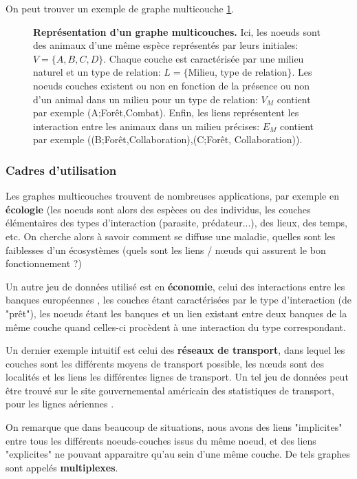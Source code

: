 \documentclass[11pt,a4paper]{article}
\theoremstyle{definition}
\theoremstyle{remark}
\theoremstyle{remark}
\begin{document}
 On peut trouver un exemple de graphe multicouche \cref{exmulti}.

\begin{figure}[h]
	\centering
	
	\caption{\textbf{Représentation d'un graphe multicouches.} Ici, les noeuds sont des animaux d'une même espèce représentés par leurs initiales: $V = \{A ,B,C,D \}$. Chaque couche est caractérisée par une milieu naturel et un type de relation: $L = \{$Milieu, type de relation$\}$. Les noeuds couches existent ou non en fonction de la présence ou non d'un animal dans un milieu pour un type de relation: $V_M$ contient par exemple (A;Forêt,Combat). Enfin, les liens représentent les interaction entre les animaux dans un milieu précises: $E_M$ contient par exemple ((B;Forêt,Collaboration),(C;Forêt, Collaboration)).}
	\label{exmulti}
\end{figure}

\subsubsection{Cadres d'utilisation}


Les graphes multicouches trouvent de nombreuses applications, par exemple en \textbf{écologie} \cite{ecolo} (les noeuds sont alors des espèces ou des individus, les couches élémentaires des types d'interaction (parasite, prédateur...), des lieux, des temps, etc. On cherche alors à savoir comment se diffuse une maladie, quelles sont les faiblesses d'un écosystèmes (quels sont les liens / nœuds qui assurent le bon fonctionnement ?)

Un autre jeu de données utilisé est en \textbf{économie}, celui des interactions entre les banques européennes \cite{interbank}, les couches étant caractérisées par le type d'interaction (de "prêt"), les noeuds étant les banques et un lien existant entre deux banques de la même couche quand celles-ci procèdent à une interaction du type correspondant.

Un dernier exemple intuitif est celui des \textbf{réseaux de transport}, dans lequel les couches sont les différents moyens de transport possible, les nœuds sont des localités et les liens les différentes lignes de transport. Un tel jeu de données peut être trouvé sur le site gouvernemental américain des statistiques de transport, pour les lignes aériennes \cite{plane}.

On remarque que dans beaucoup de situations, nous avons des liens "implicites" entre tous les différents noeuds-couches issus du même noeud, et des liens "explicites" ne pouvant apparaitre qu'au sein d'une même couche. De tels graphes sont appelés \textbf{multiplexes}.
\end{document}
